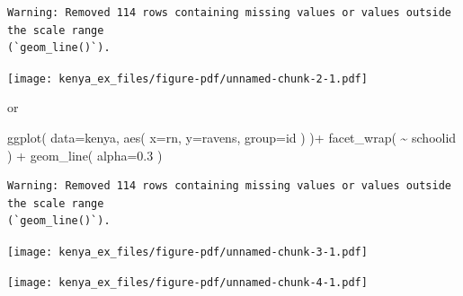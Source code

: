 \documentclass[
  letterpaper,
  DIV=11,
  numbers=noendperiod]{scrreprt}
\newenvironment{Shaded}{}{}
\newcommand{\AttributeTok}[1]{\textcolor[rgb]{0.49,0.56,0.16}{#1}}
\newcommand{\DecValTok}[1]{\textcolor[rgb]{0.25,0.63,0.44}{#1}}
\newcommand{\FloatTok}[1]{\textcolor[rgb]{0.25,0.63,0.44}{#1}}
\newcommand{\FunctionTok}[1]{\textcolor[rgb]{0.02,0.16,0.49}{#1}}
\newcommand{\NormalTok}[1]{#1}
\newcommand{\OtherTok}[1]{\textcolor[rgb]{0.00,0.44,0.13}{#1}}
\newcommand{\SpecialCharTok}[1]{\textcolor[rgb]{0.25,0.44,0.63}{#1}}
\begin{document}
\begin{verbatim}
Warning: Removed 114 rows containing missing values or values outside the scale range
(`geom_line()`).
\end{verbatim}

\texttt{[image: kenya\_ex\_files/figure-pdf/unnamed-chunk-2-1.pdf]}

or

\begin{Shaded}
\begin{Highlighting}[]
\FunctionTok{ggplot}\NormalTok{( }\AttributeTok{data=}\NormalTok{kenya, }\FunctionTok{aes}\NormalTok{( }\AttributeTok{x=}\NormalTok{rn, }\AttributeTok{y=}\NormalTok{ravens, }\AttributeTok{group=}\NormalTok{id )  )}\SpecialCharTok{+} 
            \FunctionTok{facet\_wrap}\NormalTok{( }\SpecialCharTok{\textasciitilde{}}\NormalTok{ schoolid ) }\SpecialCharTok{+} 
            \FunctionTok{geom\_line}\NormalTok{( }\AttributeTok{alpha=}\FloatTok{0.3}\NormalTok{ )}
\end{Highlighting}
\end{Shaded}

\begin{verbatim}
Warning: Removed 114 rows containing missing values or values outside the scale range
(`geom_line()`).
\end{verbatim}

\texttt{[image: kenya\_ex\_files/figure-pdf/unnamed-chunk-3-1.pdf]}

\begin{Shaded}
\end{Shaded}

\texttt{[image: kenya\_ex\_files/figure-pdf/unnamed-chunk-4-1.pdf]}
\end{document}
